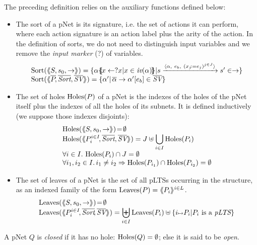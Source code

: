 \documentclass{lncs/llncs}
\begin{document}
The preceding definition relies on the auxiliary functions defined below:

\begin{definition}\label{def-sortholeleave}
  \begin{itemize}
  \item The sort of a pNet is its signature, i.e. the set of actions it can
perform, where each action signature is an action 
label plus the arity of the action. In the definition of sorts, we do not need to 
distinguish
input variables and we remove the
\emph{input marker} (?) of variables.
\[
\begin{array}{l}
\Sortop(\mylangle S,s_0, \to\myrangle) = \{\alpha\subst{x \gets ?x| 
x\in\symb{iv}(\alpha)}|s \xrightarrow{\langle \alpha,~e_b,~(x_j\!:= {e}_j)^{j\in
    J}\rangle} s'\in \to \} \\
\Sortop(\mylangle \set{\pNet}\!, %
\set{\Sort},
\set{\symb{SV}}\myrangle)
=\{\alpha' |\, \SV{\set{\alpha}}{\alpha'}{e_b}\in\set{\symb{SV}}\}
\end{array}
\]

\item
The set of holes $\operatorname{Holes}(P)$ of a pNet is the indexes of the holes of the pNet 
itself plus the indexes of all the holes of its subnets.
It is defined inductively (we suppose those indexes 
disjoints):
  \[\begin{array}{l}
\Holes(\mylangle S,s_0, \to\myrangle) \!=\! \emptyset\\
\Holes(\mylangle \pNet_i^{i\in I}\!,\set{\Sort}, \set{\symb{SV}}\myrangle) 
=J\uplus{\displaystyle \bigcup_{i\in 
I}\Holes(\pNet_i)}\\
\forall i\in I.\, \Holes(\pNet_i)\cap J=\emptyset\\
\forall i_1,i_2\in I.\,i_1\neq i_2\Rightarrow  \Holes(\pNet_{i_1})\cap\Holes(\pNet_{i_2})=\emptyset
\end{array}\]
\item
The set of leaves of a pNet is the set of all pLTSs occurring in the structure, as an 
indexed family of the form $\operatorname{Leaves}(P)= \langle\hspace{-0.58ex}\langle P_i \rangle\hspace{-0.58ex}\rangle^{i \in L}$.
\[\begin{array}{l}
\Leaves(\mylangle S,s_0, \to\myrangle) \!=\!\emptyset\\%
\Leaves(\mylangle \pNet_i^{i\in I}\!,%
\set{\Sort}\!, \set{\symb{SV}}\myrangle) = {\displaystyle \biguplus_{i\in 
I}\Leaves(\pNet_i)\uplus\{i\mapsto \pNet_i|\pNet_i \text{ is a }\pLTS\}}
\end{array}\]
\end{itemize}

A pNet $Q$ is \emph{closed} if it has no hole: $\operatorname{Holes}(Q)=\emptyset$; else it
is said to be \emph{open}.
\end{definition}
  
\end{document}
